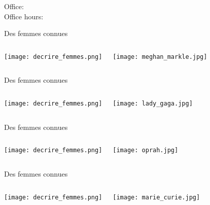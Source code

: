 \documentclass{beamer}
\subtitle[Femmes et questions]{Les femmes et les questions}
\begin{document}
  \begin{frame}
    \titlepage
    \tiny{Office: \\
          Office hours: }
  \end{frame}

  \begin{frame}{Des femmes connues}
    \begin{columns}
        \texttt{[image: decrire\_femmes.png]}
        \begin{minipage}[t][0.6\textheight]{\linewidth}
          \texttt{[image: meghan\_markle.jpg]}
        \end{minipage}
    \end{columns}
  \end{frame}

  \begin{frame}{Des femmes connues}
    \begin{columns}
        \texttt{[image: decrire\_femmes.png]}
        \begin{minipage}[t][0.6\textheight]{\linewidth}
          \texttt{[image: lady\_gaga.jpg]}
        \end{minipage}
    \end{columns}
  \end{frame}

  \begin{frame}{Des femmes connues}
    \begin{columns}
        \texttt{[image: decrire\_femmes.png]}
        \begin{minipage}[t][0.6\textheight]{\linewidth}
          \texttt{[image: oprah.jpg]}
        \end{minipage}
    \end{columns}
  \end{frame}

  \begin{frame}{Des femmes connues}
    \begin{columns}
        \texttt{[image: decrire\_femmes.png]}
        \begin{minipage}[t][0.6\textheight]{\linewidth}
          \texttt{[image: marie\_curie.jpg]}
        \end{minipage}
    \end{columns}
  \end{frame}
\end{document}
